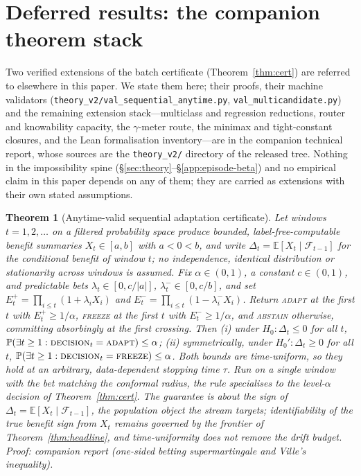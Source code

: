 \documentclass[conference]{IEEEtran}
\theoremstyle{plain}
\newtheorem{theorem}{Theorem}
\theoremstyle{definition}
\newcommand{\E}{\mathbb{E}}
\renewcommand{\Pr}{\mathbb{P}}
\begin{document}
\appendix
\section{Deferred results: the companion theorem stack}\label{app:extensions}\label{app:anytime}\label{app:theory-ext}\label{app:anytime-seq}\label{app:multicand}\label{app:stack}
Two verified extensions of the batch certificate (Theorem~\ref{thm:cert}) are referred to elsewhere
in this paper. We state them here; their proofs, their machine validators
(\texttt{theory\_v2/val\_sequential\_anytime.py}, \texttt{val\_multicandidate.py}) and the remaining
extension stack---multiclass and regression reductions, router and knowability capacity, the
$\gamma$-meter route, the minimax and tight-constant closures, and the Lean formalisation
inventory---are in the companion technical report, whose sources are the \texttt{theory\_v2/}
directory of the released tree. Nothing in the impossibility spine
(\S\ref{sec:theory}--\S\ref{app:episode-beta}) and no empirical claim in this paper depends on any
of them; they are carried as extensions with their own stated assumptions.

\begin{theorem}[Anytime-valid sequential adaptation certificate]\label{thm:anytime}
Let windows $t=1,2,\dots$ on a filtered probability space produce bounded, label-free-computable
benefit summaries $X_t\in[a,b]$ with $a<0<b$, and write $\Delta_t=\E[X_t\mid\mathcal F_{t-1}]$ for
the conditional benefit of window $t$; no independence, identical distribution or stationarity
across windows is assumed. Fix $\alpha\in(0,1)$, a constant $c\in(0,1)$, and predictable bets
$\lambda_t\in[0,c/|a|]$, $\lambda_t^{-}\in[0,c/b]$, and set
$E_t^{+}=\prod_{i\le t}(1+\lambda_iX_i)$ and $E_t^{-}=\prod_{i\le t}(1-\lambda_i^{-}X_i)$.
Return \textsc{adapt} at the first $t$ with $E_t^{+}\ge1/\alpha$, \textsc{freeze} at the first $t$
with $E_t^{-}\ge1/\alpha$, and \textsc{abstain} otherwise, committing absorbingly at the first
crossing. Then \textnormal{(i)} under $H_0:\Delta_t\le0$ for all $t$,
$\Pr(\exists t\ge1:\textsc{decision}_t=\textsc{adapt})\le\alpha$; \textnormal{(ii)} symmetrically,
under $H_0':\Delta_t\ge0$ for all $t$, $\Pr(\exists t\ge1:\textsc{decision}_t=\textsc{freeze})\le\alpha$.
Both bounds are time-uniform, so they hold at an arbitrary, data-dependent stopping time $\tau$.
Run on a single window with the bet matching the conformal radius, the rule specialises to the
level-$\alpha$ decision of Theorem~\ref{thm:cert}. The guarantee is about the sign of
$\Delta_t=\E[X_t\mid\mathcal F_{t-1}]$, the population object the stream targets; identifiability of
the \emph{true} benefit sign from $X_t$ remains governed by the frontier of
Theorem~\ref{thm:headline}, and time-uniformity does not remove the drift budget.
\emph{Proof: companion report (one-sided betting supermartingale and Ville's inequality).}
\end{theorem}
\end{document}
